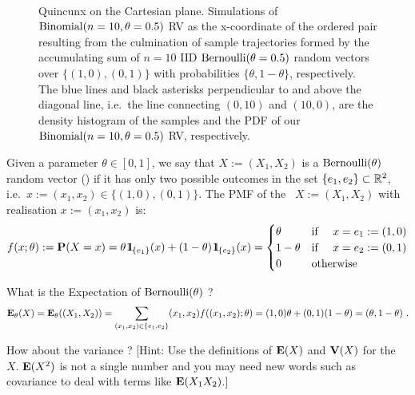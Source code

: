 \begin{figure}[htpb]
\caption{Quincunx on the Cartesian plane.  Simulations of $\mbox{{\rm Binomial}}(n=10,\theta=0.5)$ RV as the x-coordinate of the ordered pair resulting from the culmination of sample trajectories formed by the accumulating sum of $n=10$ IID $\mbox{{\rm Bernoulli}}(\theta=0.5)$ random vectors over $\{(1,0),(0,1)\}$ with probabilities $\{\theta,1-\theta\}$, respectively.  The blue lines and black asterisks perpendicular to and above the diagonal line, i.e.~the line connecting $(0,10)$ and $(10,0)$, are the density histogram of the samples and the PDF of our $\mbox{{\rm Binomial}}(n=10,\theta=0.5)$ RV, respectively.\label{F:BinomQuincunxn10r10r1000}}
\centering
\mbox{ \hspace{-2cm}
	    }
\end{figure}

\begin{model}[$\bernoulli(\theta)$ \rv]
Given a parameter $\theta \in [0,1]$, we say that $X := (X_1,X_2)$ is a $\bernoulli(\theta)$ random vector (\rv) if it has only two possible outcomes in the set $\{e_1,e_2\} \subset \mathbb{R}^2$, i.e.~$x:=(x_1,x_2) \in \{(1,0),(0,1)\}$.  The PMF of the \rv~$X:= (X_1,X_2)$ with realisation $x:=(x_1,x_2)$ is:
\[
f(x;\theta) := \mathbf{P}(X=x) = \theta \, {1}\mspace{-11 mu}{1}_{\{e_1\}}(x) + (1-\theta) \, {1}\mspace{-11 mu}{1}_{\{e_2\}}(x) =
\begin{cases}
\theta & \text{if } \quad x=e_1:=(1,0) \\
1- \theta & \text{if } \quad x=e_2:=(0,1) \\
0 & \text{otherwise}
\end{cases}
\]
\end{model}


\begin{classwork}
What is the Expectation of $\bernoulli(\theta)$ \rv?
\[
\mathbf{E}_{\theta}(X) = \mathbf{E}_{\theta}((X_1,X_2)) = \sum_{(x_1,x_2) \in \{e_1,e_2\}} (x_1,x_2) f((x_1,x_2);\theta) = (1,0) \theta + (0,1) (1-\theta) = (\theta,1-\theta) \ .
\]

How about the variance ? [Hint: Use the definitions of $\mathbf{E}(X)$ and $\mathbf{V}(X)$ for the \rv~$X$.  $\mathbf{E}(X^2)$ is not a single number and you may need new words such as covariance to deal with terms like $\mathbf{E}(X_1 X_2)$.]
\end{classwork}

